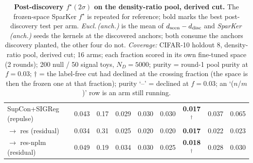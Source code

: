 \begin{table}[t]
\begin{tabular}{lcccccccc}
\addlinespace
SupCon+SIGReg (repulse) & 0.043 & 0.17 & 0.029 & 0.030 & 0.030 & \textbf{0.017$^\dagger$} & 0.037 & 0.065 \\
\quad $\to$ res (residual) & 0.034 & 0.31 & 0.025 & 0.020 & 0.020 & \textbf{0.017} & 0.022 & 0.023 \\
\quad $\to$ res-nplm (residual) & 0.049 & 0.19 & 0.034 & 0.030 & 0.025 & \textbf{0.018$^\dagger$} & 0.028 & 0.030 \\
\bottomrule
\end{tabular}
\caption{\textbf{Post-discovery $f^\star(2\sigma)$ on the density-ratio pool, derived cut.} The frozen-space SparKer $f^\star$ is repeated for reference; bold marks the best post-discovery test per arm. \emph{Eucl.\,(anch.)} is the mean of $d_{\rm seen}-d_{\rm disc}$ and \emph{SparKer\,(anch.)} seeds the kernels at the discovered anchors; both consume the anchors discovery planted, the other four do not. \emph{Coverage:} CIFAR-10 holdout 8, density-ratio pool, derived cut; 16 arms; each fraction scored in its own fine-tuned space (2 rounds); 200 null / 50 signal toys, $N_D{=}5000$; purity = round-1 pool purity at $f{=}0.03$; $\dagger$ = the label-free cut had declined at the crossing fraction (the space is then the frozen one at that fraction); purity `--' = declined at $f{=}0.03$; an `($n$/$m$)' row is an arm still running.}
\label{tab:sigma_post_cifar10_h8_np-legal}
\end{table}
